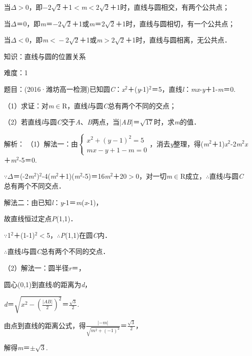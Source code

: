 \documentclass{article} %
\begin{document}
当$\Delta$$\mathrm{>}$0，即$-2\sqrt{2}$＋1$\mathrm{<}$\textit{m}$\mathrm{<}$$2\sqrt{2}$＋1时，直线与圆相交，有两个公共点；

当$\Delta$＝0，即\textit{m}＝$-2\sqrt{2}$＋1或\textit{m}＝$2\sqrt{2}$＋1时，直线与圆相切，有一个公共点；

当$\Delta$$\mathrm{<}$0，即\textit{m}$\mathrm{<}-2\sqrt{2}$＋1或\textit{m}$\mathrm{>}$$2\sqrt{2}$＋1时，直线与圆相离，无公共点．

知识：直线与圆的位置关系

难度：1

题目：(2016·潍坊高一检测)已知圆\textit{C}：\textit{x}${}^{2}$＋(\textit{y}-1)${}^{2}$＝5，直线\textit{l}：\textit{mx}-\textit{y}＋1-\textit{m}＝0.

（1）求证：对\textit{m}$\mathrm{\in}$R，直线\textit{l}与圆\textit{C}总有两个不同的交点；

（2）若直线\textit{l}与圆\textit{C}交于\textit{A}、\textit{B}两点，当|\textit{AB}|＝$\sqrt{17}$时，求\textit{m}的值．

解析：
（1）解法一：由$\left\{\begin{array}{r} x^2+(y-1)^2=5\\ mx-y+1-m=0 \end{array} \right.$，消去\textit{y}整理，得(\textit{m}${}^{2}$＋1)\textit{x}${}^{2}$-2\textit{m}${}^{2}$\textit{x}＋\textit{m}${}^{2}$-5＝0.

$\mathrm{\because}$$\Delta$＝(-2\textit{m}${}^{2}$)${}^{2}$-4(\textit{m}${}^{2}$＋1)(\textit{m}${}^{2}$-5)＝16\textit{m}${}^{2}$＋20$\mathrm{>}$0，对一切\textit{m}$\mathrm{\in}$R成立，$\mathrm{\therefore}$直线\textit{l}与圆\textit{C}总有两个不同交点．

解法二：由已知\textit{l}：\textit{y}-1＝\textit{m}(\textit{x}-1)，

故直线恒过定点\textit{P}(1,1)．

$\mathrm{\because}$1${}^{2}$＋(1-1)${}^{2}$$\mathrm{<}$5，$\mathrm{\therefore}$\textit{P}(1,1)在圆\textit{C}内．

$\mathrm{\therefore}$直线\textit{l}与圆\textit{C}总有两个不同的交点．

（2）解法一：圆半径\textit{r}＝，

圆心(0,1)到直线\textit{l}的距离为\textit{d}，

\textit{d}＝$\sqrt{x^2-(\frac{|AB|}{2})^2}$＝$\frac{\sqrt{3}}{2}$.

由点到直线的距离公式，得$\frac{|-m|}{\sqrt{m^2+(-1)^2}}$＝$\frac{\sqrt{3}}{2}$，

解得\textit{m}＝$\mathrm{\pm}\sqrt{3}$.
\end{document}
